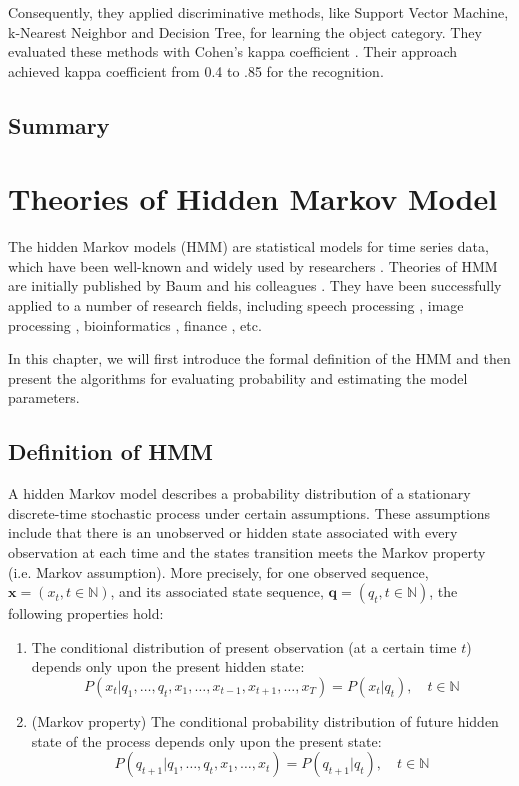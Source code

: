 \documentclass[12pt,final,twoside]{report}
\theoremstyle{plain}
\theoremstyle{definition}
\theoremstyle{remark}
\begin{document}
Consequently, they applied discriminative methods, like Support Vector Machine, k-Nearest Neighbor and Decision Tree, for learning the object category. They evaluated these methods with Cohen's kappa coefficient \cite{cohen_coefficient_1960}. Their approach achieved kappa coefficient from 0.4 to .85 for the recognition.

\section{Summary}

\cleardoublepage
\chapter{Theories of Hidden Markov Model}
The hidden Markov models (HMM) are statistical models for time series data, which have been well-known and widely used by researchers \cite{rabiner_tutorial_1989, rabiner_fundamentals_1993}. Theories of HMM are initially published by Baum and his colleagues \cite{baum_statistical_1966, baum_maximization_1970}. They have been successfully applied to a number of research fields, including speech processing \cite{baker_dragon_1975, rabiner_fundamentals_1993}, image processing \cite{chen_off-line_1994}, bioinformatics \cite{koski_hidden_2001}, finance \cite{bhar_hidden_2004}, etc.

In this chapter, we will first introduce the formal definition of the HMM and then present the algorithms for evaluating probability and estimating the model parameters.

\section{Definition of HMM} \label{sec:hmm}
A hidden Markov model describes a probability distribution of a stationary discrete-time stochastic process under certain assumptions. These assumptions include that there is an unobserved or hidden state associated with every observation at each time and the states transition meets the Markov property (i.e. Markov assumption). More precisely, for one observed sequence, $\mathbf{x}=(x_t, t \in \mathbb{N})$, and its associated state sequence, $\mathbf{q}=(q_t, t \in \mathbb{N})$, the following properties hold:

\begin{enumerate}
  \item The conditional distribution of present observation (at a certain time $t$) depends only upon the present hidden state:
  \begin{equation}
    P(x_t|q_1, \dots, q_t, x_1, \dots, x_{t-1},x_{t+1},\dots,x_T) = P(x_t|q_t), \quad t \in \mathbb{N} 
    \label{eq:ob_prob}
  \end{equation}
  \item (Markov property) The conditional probability distribution of future hidden state of the process depends only upon the present state:
  \begin{equation}
    P(q_{t+1}|q_1, \dots, q_t, x_1, \dots, x_t) = P(q_{t+1}|q_t),\quad t \in \mathbb{N}
    \label{eq:markov_prop}
  \end{equation}
\end{enumerate}
\end{document}
